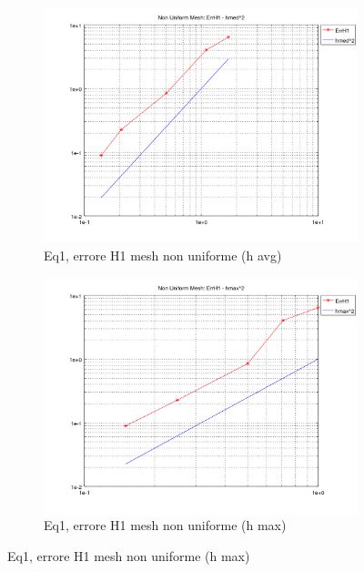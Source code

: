 \documentclass[12pt,a4paper]{report}
\theoremstyle{theorem}
\theoremstyle{theorem}
\theoremstyle{definition}
\begin{document}
\begin{figure}[!h]
	\centering
	\begin{subfigure}[b]{0.49\textwidth}
    		\includegraphics[width=\textwidth]{Eq1-H1avg.png}
    		\caption{Eq1, errore H1 mesh non uniforme (h avg)}
    	\end{subfigure}
    	\begin{subfigure}[b]{0.49\textwidth}
    		\includegraphics[width=\textwidth]{Eq1-H1max.png}
    		\caption{Eq1, errore H1 mesh non uniforme (h max)}
    	\end{subfigure}
\end{figure}
\hfill \\
\end{document}
